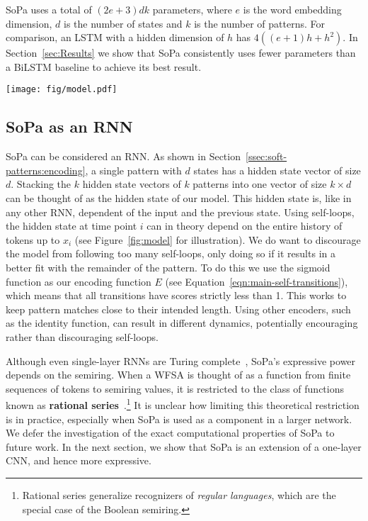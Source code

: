 \documentclass[11pt,a4paper]{article}
\renewcommand{\cite}[1]{\citep{#1}}
\newcommand{\isubsection}[2]{\subsection{#1}\label{ssec:#2}}
\newcommand{\secref}[1]{Section~\ref{sec:#1}}
\newcommand{\subsecref}[1]{Section~\ref{ssec:#1}}
\newcommand{\figref}[1]{Figure~\ref{#1}}
\newcommand{\SoftP}{SoPa\xspace}
\newcommand{\term}[1]{\textbf{#1}} %
\newcommand{\relat}{an extension of\xspace}
\begin{document}
\SoftP uses a total of $(2 e + 3) d k$ parameters,
where $e$ is the word embedding dimension, $d$ is the number of states and $k$ is the
number of patterns.
For comparison, an LSTM with a hidden dimension of $h$ has
$4 ((e + 1) h + h^2)$.
In \secref{Results} we show that \SoftP consistently uses fewer parameters than a BiLSTM baseline to
achieve its best result.


\begin{figure*}[t]
\begin{center}
\hspace{-0.3cm}
  \texttt{[image: fig/model.pdf]}
\end{center}


\caption{
  \label{fig:model}
  State activations of two patterns as they score a document.
  pattern1 (length three) matches on \textit{``in years''}.
  pattern2  (length five) matches on \textit{``funniest and most likeable book''}, using a self-loop to consume the token \textit{``most''}.
  Active states in the best match are marked with arrow cursors.
}
\end{figure*}

\isubsection{\SoftP as an RNN}{RNN}
\SoftP can be considered an RNN.
As shown in \subsecref{soft-patterns:encoding}, a single pattern with $d$ states has a hidden state vector of size $d$. 
Stacking the $k$ hidden state vectors of $k$ patterns into one vector of size $k \times d$ can be thought of as the hidden state of our model.
This hidden state is, like in any other RNN, dependent of the input and the previous state.
Using self-loops, the hidden state at time point $i$ can in theory depend on the entire history of tokens up to $x_i$ (see \figref{fig:model} for illustration).
We do want to discourage the model from following too many self-loops, only doing so if it results in a better fit with the remainder of the pattern.
To do this we use the sigmoid function as our encoding function $E$ (see Equation~\ref{eqn:main-self-transitions}), which means that all transitions have scores strictly less than 1.
This works to keep pattern matches close to their intended length.
Using other encoders, such as the identity function, can result in different dynamics, potentially encouraging rather than discouraging self-loops.

Although even single-layer RNNs are Turing complete~\cite{Siegelmann:1995},
\SoftP's expressive power depends on the semiring.
When a WFSA is thought of as a function from finite sequences
of tokens to semiring values, it is restricted to the class of functions known as
\term{rational series}~\cite{schutzenberger_definition_1961,droste_kleeneschutzenberger_1999,sakarovitch_rational_2009}.\footnote{Rational series generalize recognizers of \emph{regular languages}, which are
the special case of the Boolean semiring.
}
It is unclear how limiting this theoretical restriction is in practice, especially when \SoftP
is used as a component in a larger network.
We defer the investigation of the exact computational properties of \SoftP to future work.
In the next section, we show that \SoftP is \relat a one-layer CNN, and hence more expressive.
\end{document}

